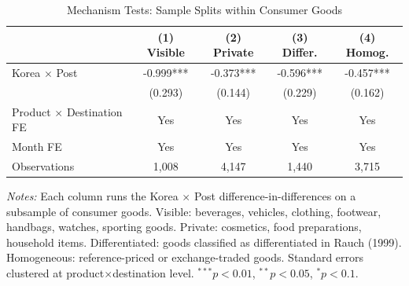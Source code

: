 \begin{table}[htbp]
\centering
\caption{Mechanism Tests: Sample Splits within Consumer Goods}
\label{tab:mechanisms}
\begin{threeparttable}
\begin{tabular}{lcccc}
\toprule
 & (1) Visible & (2) Private & (3) Differ. & (4) Homog. \\
\midrule
Korea $\times$ Post & -0.999*** & -0.373*** & -0.596*** & -0.457*** \\
 & (0.293) & (0.144) & (0.229) & (0.162) \\[6pt]
\midrule
Product $\times$ Destination FE & Yes & Yes & Yes & Yes \\
Month FE & Yes & Yes & Yes & Yes \\
Observations & 1,008 & 4,147 & 1,440 & 3,715 \\
\bottomrule
\end{tabular}
\begin{tablenotes}[flushleft]\footnotesize
\item \textit{Notes:} Each column runs the Korea $\times$ Post difference-in-differences on a subsample of consumer goods. Visible: beverages, vehicles, clothing, footwear, handbags, watches, sporting goods. Private: cosmetics, food preparations, household items. Differentiated: goods classified as differentiated in Rauch (1999). Homogeneous: reference-priced or exchange-traded goods. Standard errors clustered at product$\times$destination level. $^{***}p<0.01$, $^{**}p<0.05$, $^{*}p<0.1$.
\end{tablenotes}
\end{threeparttable}
\end{table}
